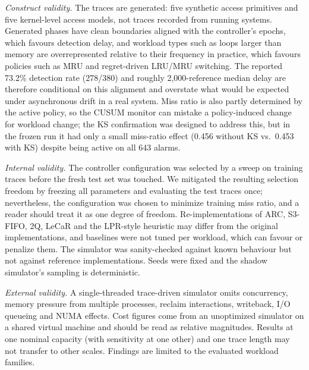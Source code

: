 \documentclass[10pt,twocolumn,a4paper]{IEEEtran}
\begin{document}
\emph{Construct validity.} The traces are generated: five synthetic access
primitives and five kernel-level access models, not traces recorded from
running systems. Generated phases have clean boundaries aligned with the controller's epochs,
which favours detection delay, and workload types such as loops larger than
memory are overrepresented relative to their frequency in practice, which
favours policies such as MRU and regret-driven LRU/MRU switching. The reported
73.2\% detection rate (278/380) and roughly 2,000-reference
median delay are therefore conditional on this alignment and overstate what
would be expected under asynchronous drift in a real system. Miss ratio is also partly determined by the active policy, so the
CUSUM monitor can mistake a policy-induced change for workload change; the KS confirmation was designed
to address this, but in the frozen run it had only a small miss-ratio effect
(0.456 without KS vs.\ 0.453 with KS) despite being active on all 643 alarms.

\emph{Internal validity.} The controller configuration was selected by a sweep
on training traces before the fresh test set was touched. We mitigated the
resulting selection freedom by freezing all parameters and evaluating the test
traces once; nevertheless, the configuration was chosen to minimize training
miss ratio, and a reader should treat it as one degree of freedom.
Re-implementations of ARC, S3-FIFO, 2Q, LeCaR and the LPR-style
heuristic may differ from the original implementations, and baselines were not
tuned per workload, which can favour or penalize them. The simulator was
sanity-checked against known behaviour but not against reference
implementations. Seeds were fixed and the shadow simulator's sampling is
deterministic.

\emph{External validity.} A single-threaded trace-driven simulator omits
concurrency, memory pressure from multiple processes, reclaim interactions,
writeback, I/O queueing and NUMA effects. Cost figures come from an
unoptimized simulator on a shared virtual machine and should be read as
relative magnitudes. Results at one nominal capacity (with sensitivity at one other) and one trace
length may not transfer to other scales. Findings are
limited to the evaluated workload families.
\end{document}
